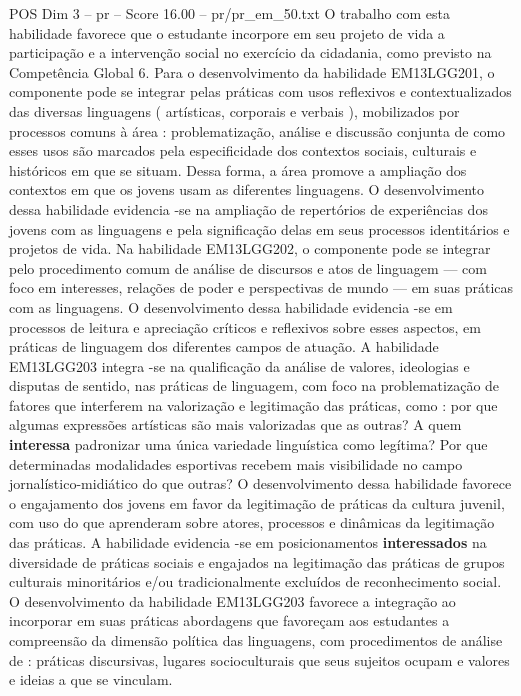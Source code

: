 \begin{textsample}{POS Dim 3 – pr – Score 16.00 – pr/pr\_em\_50.txt}
O trabalho com esta habilidade favorece que o estudante incorpore em seu projeto de vida a participação e a intervenção social no exercício da cidadania, como previsto na Competência Global 6.
Para o desenvolvimento da habilidade EM13LGG201, o componente pode se integrar pelas práticas com usos reflexivos e contextualizados das diversas linguagens ( artísticas, corporais e verbais ), mobilizados por processos comuns à área : problematização, análise e discussão conjunta de como esses usos são marcados pela especificidade dos contextos sociais, culturais e históricos em que se situam.
Dessa forma, a área promove a ampliação dos contextos em que os jovens usam as diferentes linguagens.
O desenvolvimento dessa habilidade evidencia -se na ampliação de repertórios de experiências dos jovens com as linguagens e pela significação delas em seus processos identitários e projetos de vida.
Na habilidade EM13LGG202, o componente pode se integrar pelo procedimento comum de análise de discursos e atos de linguagem — com foco em interesses, relações de poder e perspectivas de mundo — em suas práticas com as linguagens.
O desenvolvimento dessa habilidade evidencia -se em processos de leitura e apreciação críticos e reflexivos sobre esses aspectos, em práticas de linguagem dos diferentes campos de atuação.
A habilidade EM13LGG203 integra -se na qualificação da análise de valores, ideologias e disputas de sentido, nas práticas de linguagem, com foco na problematização de fatores que interferem na valorização e legitimação das práticas, como : por que algumas expressões artísticas são mais valorizadas que as outras?
A quem \textbf{interessa} padronizar uma única variedade linguística como legítima?
Por que determinadas modalidades esportivas recebem mais visibilidade no campo jornalístico-midiático do que outras?
O desenvolvimento dessa habilidade favorece o engajamento dos jovens em favor da legitimação de práticas da cultura juvenil, com uso do que aprenderam sobre atores, processos e dinâmicas da legitimação das práticas.
A habilidade evidencia -se em posicionamentos \textbf{interessados} na diversidade de práticas sociais e engajados na legitimação das práticas de grupos culturais minoritários e/ou tradicionalmente excluídos de reconhecimento social.
O desenvolvimento da habilidade EM13LGG203 favorece a integração ao incorporar em suas práticas abordagens que favoreçam aos estudantes a compreensão da dimensão política das linguagens, com procedimentos de análise de : práticas discursivas, lugares socioculturais que seus sujeitos ocupam e valores e ideias a que se vinculam.

\end{textsample}
